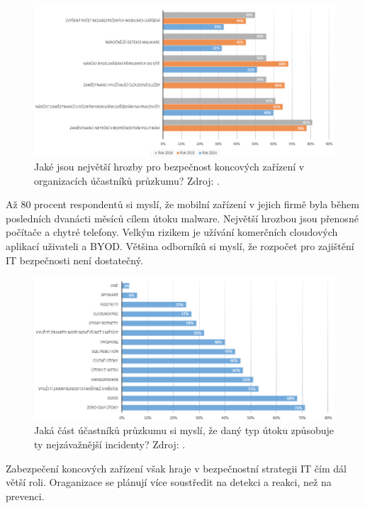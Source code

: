 \begin{figure}[h!]\label{hrozby}
\centering
\includegraphics[width=14cm]{img/hrozby}
\caption{Jaké jsou největší hrozby pro bezpečnost koncových zařízení v organizacích účastníků průzkumu? Zdroj: \cite{ponemon}.}
\end{figure}

Až 80 procent respondentů si myslí, že mobilní zařízení v jejich firmě byla během posledních dvanácti měsíců cílem útoku malware. Největší hrozbou jsou přenosné počítače a chytré telefony. Velkým rizikem je užívání komerčních cloudových aplikací uživateli a BYOD. Většina odborníků si myslí, že rozpočet pro zajištění IT bezpečnosti není dostatečný. 

\begin{figure}[h!]\label{hrozbyUtoky}
\centering
\includegraphics[width=14cm]{img/hrozbyUtoky}
\caption{Jaká část účastníků průzkumu si myslí, že daný typ útoku způsobuje ty nejzávažnější incidenty? Zdroj: \cite{ponemon}.} 
\end{figure}%

Zabezpečení koncových zařízení však hraje v bezpečnostní strategii IT čím dál větší roli. Oraganizace se plánují více soustředit na detekci a reakci, než na prevenci. 





